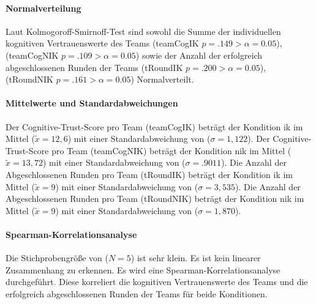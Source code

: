 \documentclass[a4paper,11pt]{article}%
\renewcommand{\\}{\vspace*{0.5\baselineskip} \newline}
\begin{document}
\paragraph{Normalverteilung}
Laut Kolmogoroff-Smirnoff-Test sind sowohl die Summe der individuellen kognitiven Vertrauenswerte des Teams (\ac{teamCogIK} $p = .149 > \alpha = 0.05$), (\ac{teamCogNIK} $p = .109 > \alpha = 0.05$) sowie der Anzahl der erfolgreich abgeschlossenen Runden der Teams (\ac{tRoundIK} $p = .200 > \alpha = 0.05$), (\ac{tRoundNIK} $p = .161 > \alpha = 0.05$) Normalverteilt.

\paragraph{Mittelwerte und Standardabweichungen}
Der Cognitive-Trust-Score pro Team (\ac{teamCogIK}) beträgt der Kondition \ac{ik} im Mittel ($\tilde x = 12,6$) mit einer Standardabweichung von ($\sigma = 1,122$).\newline 
Der Cognitive-Trust-Score pro Team (\ac{teamCogNIK}) beträgt der Kondition \ac{nik} im Mittel ($\tilde x = 13,72$) mit einer Standardabweichung von ($\sigma = .9011$). \newline 
Die Anzahl der Abgeschlossenen Runden pro Team (\ac{tRoundIK}) beträgt der Kondition \ac{ik} im Mittel ($\tilde x = 9$) mit einer Standardabweichung von ($\sigma = 3,535$).\newline 
 Die Anzahl der Abgeschlossenen Runden pro Team (\ac{tRoundNIK}) beträgt der Kondition \ac{nik} im Mittel ($\tilde x = 9$) mit einer Standardabweichung von ($\sigma = 1,870$). 

\paragraph{Spearman-Korrelationsanalyse}
Die Stichprobengröße von ($N=5$) ist sehr klein. Es ist kein linearer Zusammenhang zu erkennen. Es wird eine Spearman-Korrelationsanalyse durchgeführt. Diese korreliert die kognitiven Vertrauenswerte des Teams und die erfolgreich abgeschlossenen Runden der Teams für beide Konditionen.

\end{document}
